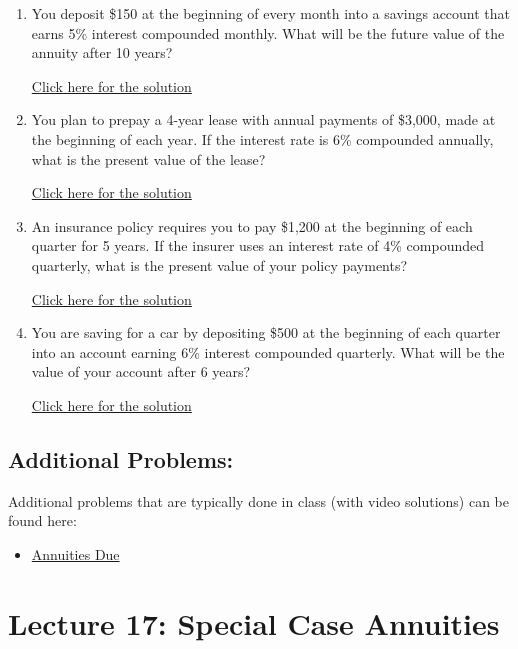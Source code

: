 \documentclass[
]{book}
\providecommand{\tightlist}{%
  \setlength{\itemsep}{0pt}\setlength{\parskip}{0pt}}
\begin{document}
\begin{enumerate}
\def\labelenumi{\arabic{enumi}.}
\tightlist
\item
  You deposit \$150 at the beginning of every month into a savings account that earns 5\% interest compounded monthly. What will be the future value of the annuity after 10 years?

  \href{https://youtu.be/2ZHW43unmi8}{Click here for the solution}
\item
  You plan to prepay a 4-year lease with annual payments of \$3,000, made at the beginning of each year. If the interest rate is 6\% compounded annually, what is the present value of the lease?

  \href{https://youtu.be/oiKuXhGN_RY}{Click here for the solution}
\item
  An insurance policy requires you to pay \$1,200 at the beginning of each quarter for 5 years. If the insurer uses an interest rate of 4\% compounded quarterly, what is the present value of your policy payments?

  \href{https://youtu.be/JplE47c91xU}{Click here for the solution}
\item
  You are saving for a car by depositing \$500 at the beginning of each quarter into an account earning 6\% interest compounded quarterly. What will be the value of your account after 6 years?

  \href{https://youtu.be/RydqSKjDjBg}{Click here for the solution}
\end{enumerate}

\subsection*{Additional Problems:}\label{additional-problems-16}

Additional problems that are typically done in class (with video solutions) can be found here:

\begin{itemize}
\tightlist
\item
  \href{https://theelementsmath.github.io/M114/more-on-annuities.html\#annuities-due}{Annuities Due}
\end{itemize}

\section*{Lecture 17: Special Case Annuities}\label{lecture-17-special-case-annuities}
\end{document}
